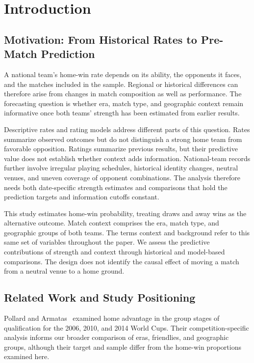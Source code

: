 \section{Introduction}
\subsection{Motivation: From Historical Rates to Pre-Match Prediction}

A national team's home-win rate depends on its ability, the opponents it faces, and the matches included in the sample. Regional or historical differences can therefore arise from changes in match composition as well as performance. The forecasting question is whether era, match type, and geographic context remain informative once both teams' strength has been estimated from earlier results.

Descriptive rates and rating models address different parts of this question. Rates summarize observed outcomes but do not distinguish a strong home team from favorable opposition. Ratings summarize previous results, but their predictive value does not establish whether context adds information. National-team records further involve irregular playing schedules, historical identity changes, neutral venues, and uneven coverage of opponent combinations. The analysis therefore needs both date-specific strength estimates and comparisons that hold the prediction targets and information cutoffs constant.

This study estimates home-win probability, treating draws and away wins as the alternative outcome. Match context comprises the era, match type, and geographic groups of both teams. The terms context and background refer to this same set of variables throughout the paper. We assess the predictive contributions of strength and context through historical and model-based comparisons. The design does not identify the causal effect of moving a match from a neutral venue to a home ground.

\subsection{Related Work and Study Positioning}

Pollard and Armatas~\citep{pollard2017qualification} examined home advantage in the group stages of qualification for the 2006, 2010, and 2014 World Cups. Their competition-specific analysis informs our broader comparison of eras, friendlies, and geographic groups, although their target and sample differ from the home-win proportions examined here.

